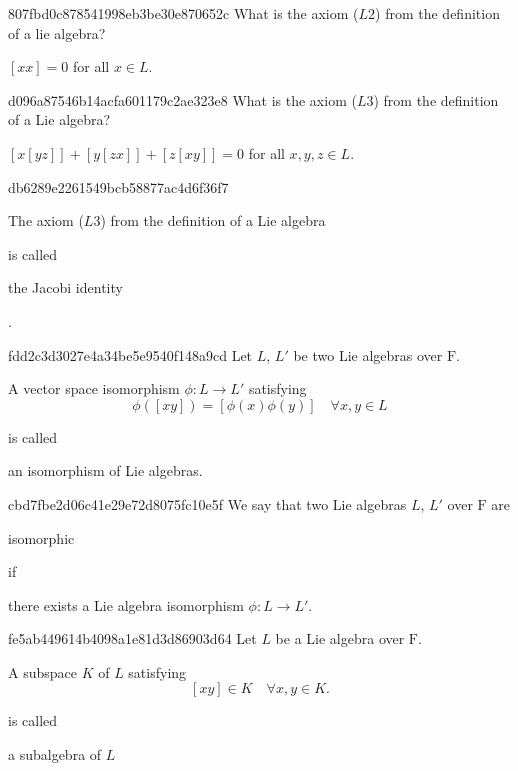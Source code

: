 \begin{note}{807fbd0c878541998eb3be30e870652c}
    What is the axiom (\( L 2 \)) from the definition of a lie algebra?

    \begin{cloze}{1}
        \( [x x] = 0 \) \quad for all \( x \in L \).
    \end{cloze}
\end{note}

\begin{note}{d096a87546b14acfa601179c2ae323e8}
    What is the axiom (\( L 3 \)) from the definition of a Lie algebra?

    \begin{cloze}{1}
        \( [x[yz]] + [y[zx]] + [z[xy]] = 0 \) \quad for all \( x,  y, z \in L \).
    \end{cloze}
\end{note}

\begin{note}{db6289e2261549bcb58877ac4d6f36f7}
    \begin{icloze}{2}The axiom (\( L 3 \)) from the definition of a Lie algebra\end{icloze} is called
    \begin{icloze}{1}the Jacobi identity\end{icloze}.
\end{note}

\begin{note}{fdd2c3d3027e4a34be5e9540f148a9cd}
    Let \( L \), \( L' \) be two Lie algebras over \( \mathrm F \). \begin{icloze}{1}A vector space isomorphism \( \phi : L \to L' \) satisfying
    \[
        \phi([xy]) = [\phi(x) \phi(y)] \quad \forall x,y \in L
    \]\end{icloze}
    is called \begin{icloze}{2}an isomorphism of Lie algebras.\end{icloze}
\end{note}

\begin{note}{cbd7fbe2d06c41e29e72d8075fc10e5f}
    We say that two Lie algebras \( L \), \( L' \) over \( \mathrm F \) are \begin{icloze}{2}isomorphic\end{icloze} if \begin{icloze}{1}there exists a Lie algebra isomorphism \( \phi : L \to L' \).\end{icloze}
\end{note}

\begin{note}{fe5ab449614b4098a1e81d3d86903d64}
    Let \( L \) be a Lie algebra over \( \mathrm F \). \begin{icloze}{2}A subspace \( K \) of \( L \) satisfying
        \[
            [xy] \in K \quad \forall x,y \in K.
        \]
    \end{icloze}
    is called \begin{icloze}{1}a subalgebra of \( L \)\end{icloze}
\end{note}

